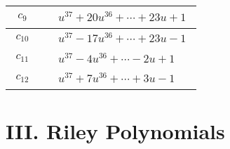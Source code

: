 \documentclass[1p]{elsarticle_modified}
\theoremstyle{definition}
\begin{document}
\begin{tabular}{m{50pt}|m{274pt}}
\hline $$\begin{aligned}c_{9}\end{aligned}$$&$\begin{aligned}
&u^{37}+20 u^{36}+\cdots+23 u+1
\end{aligned}$\\
\hline $$\begin{aligned}c_{10}\end{aligned}$$&$\begin{aligned}
&u^{37}-17 u^{36}+\cdots+23 u-1
\end{aligned}$\\
\hline $$\begin{aligned}c_{11}\end{aligned}$$&$\begin{aligned}
&u^{37}-4 u^{36}+\cdots-2 u+1
\end{aligned}$\\
\hline $$\begin{aligned}c_{12}\end{aligned}$$&$\begin{aligned}
&u^{37}+7 u^{36}+\cdots+3 u-1
\end{aligned}$\\
\hline
\end{tabular}\newpage\renewcommand{\arraystretch}{1}
\centering \section*{ III. Riley Polynomials}
\end{document}
